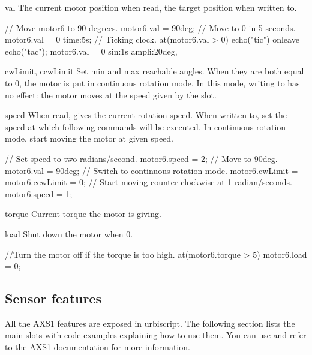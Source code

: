 \begin{urbiscriptapi}
\item[val] The current motor position when read, the target position when
  written to.

\begin{urbiunchecked}
// Move motor6 to 90 degrees.
motor6.val = 90deg;
// Move to 0 in 5 seconds.
motor6.val = 0 time:5s;
// Ticking clock.
at(motor6.val > 0) echo("tic") onleave echo("tac");
motor6.val = 0 sin:1s ampli:20deg,
\end{urbiunchecked}

\item[cwLimit, ccwLimit]%
  Set min and max reachable angles. When they are both equal to 0, the motor
  is put in continuous rotation mode. In this mode, writing to 
  has no effect: the motor moves at the speed given by the 
  slot.

\item[speed] When read, gives the current rotation speed. When written to,
  set the speed at which following commands will be executed. In continuous
  rotation mode, start moving the motor at given speed.
\begin{urbiunchecked}
// Set speed to two radians/second.
motor6.speed = 2;
// Move to 90deg.
motor6.val = 90deg;
// Switch to continuous rotation mode.
motor6.cwLimit = motor6.ccwLimit = 0;
// Start moving counter-clockwise at 1 radian/seconds.
motor6.speed = 1;
\end{urbiunchecked}

\item[torque]
  Current torque the motor is giving.

\item[load]
  Shut down the motor when 0.

\begin{urbiunchecked}
//Turn the motor off if the torque is too high.
at(motor6.torque > 5) motor6.load = 0;
\end{urbiunchecked}

\end{urbiscriptapi}

\subsection{Sensor features}
\def\currentObject{AXS1}

All the AXS1 features are exposed in urbiscript. The following section lists
the main slots with code examples explaining how to use them.  You can use
 and refer to the AXS1 documentation for
more information.

